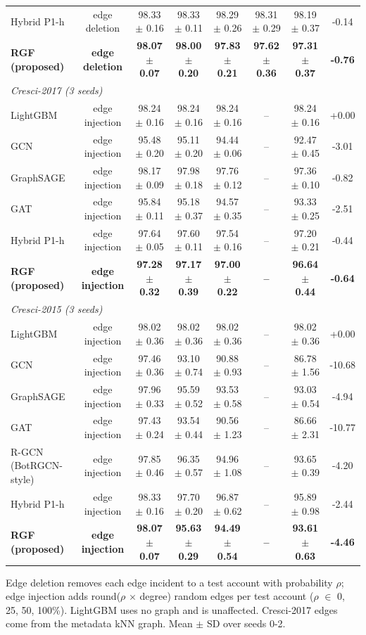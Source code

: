 \begin{table}[!t]
\begin{tabular}{lccccccc}
Hybrid P1-h & edge deletion & 98.33 $\pm$ 0.16 & 98.33 $\pm$ 0.11 & 98.29 $\pm$ 0.26 & 98.31 $\pm$ 0.29 & 98.19 $\pm$ 0.37 & -0.14 \\
\textbf{RGF (proposed)} & \textbf{edge deletion} & \textbf{98.07 $\pm$ 0.07} & \textbf{98.00 $\pm$ 0.20} & \textbf{97.83 $\pm$ 0.21} & \textbf{97.62 $\pm$ 0.36} & \textbf{97.31 $\pm$ 0.37} & \textbf{-0.76} \\
\multicolumn{8}{l}{\textit{Cresci-2017 (3 seeds)}} \\
LightGBM & edge injection & 98.24 $\pm$ 0.16 & 98.24 $\pm$ 0.16 & 98.24 $\pm$ 0.16 & -- & 98.24 $\pm$ 0.16 & +0.00 \\
GCN & edge injection & 95.48 $\pm$ 0.20 & 95.11 $\pm$ 0.20 & 94.44 $\pm$ 0.06 & -- & 92.47 $\pm$ 0.45 & -3.01 \\
GraphSAGE & edge injection & 98.17 $\pm$ 0.09 & 97.98 $\pm$ 0.18 & 97.76 $\pm$ 0.12 & -- & 97.36 $\pm$ 0.10 & -0.82 \\
GAT & edge injection & 95.84 $\pm$ 0.11 & 95.18 $\pm$ 0.37 & 94.57 $\pm$ 0.35 & -- & 93.33 $\pm$ 0.25 & -2.51 \\
Hybrid P1-h & edge injection & 97.64 $\pm$ 0.05 & 97.60 $\pm$ 0.11 & 97.54 $\pm$ 0.16 & -- & 97.20 $\pm$ 0.21 & -0.44 \\
\textbf{RGF (proposed)} & \textbf{edge injection} & \textbf{97.28 $\pm$ 0.32} & \textbf{97.17 $\pm$ 0.39} & \textbf{97.00 $\pm$ 0.22} & \textbf{--} & \textbf{96.64 $\pm$ 0.44} & \textbf{-0.64} \\
\multicolumn{8}{l}{\textit{Cresci-2015 (3 seeds)}} \\
LightGBM & edge injection & 98.02 $\pm$ 0.36 & 98.02 $\pm$ 0.36 & 98.02 $\pm$ 0.36 & -- & 98.02 $\pm$ 0.36 & +0.00 \\
GCN & edge injection & 97.46 $\pm$ 0.36 & 93.10 $\pm$ 0.74 & 90.88 $\pm$ 0.93 & -- & 86.78 $\pm$ 1.56 & -10.68 \\
GraphSAGE & edge injection & 97.96 $\pm$ 0.33 & 95.59 $\pm$ 0.52 & 93.53 $\pm$ 0.58 & -- & 93.03 $\pm$ 0.54 & -4.94 \\
GAT & edge injection & 97.43 $\pm$ 0.24 & 93.54 $\pm$ 0.44 & 90.56 $\pm$ 1.23 & -- & 86.66 $\pm$ 2.31 & -10.77 \\
R-GCN (BotRGCN-style) & edge injection & 97.85 $\pm$ 0.46 & 96.35 $\pm$ 0.57 & 94.96 $\pm$ 1.08 & -- & 93.65 $\pm$ 0.39 & -4.20 \\
Hybrid P1-h & edge injection & 98.33 $\pm$ 0.16 & 97.70 $\pm$ 0.20 & 96.87 $\pm$ 0.62 & -- & 95.89 $\pm$ 0.98 & -2.44 \\
\textbf{RGF (proposed)} & \textbf{edge injection} & \textbf{98.07 $\pm$ 0.07} & \textbf{95.63 $\pm$ 0.29} & \textbf{94.49 $\pm$ 0.54} & \textbf{--} & \textbf{93.61 $\pm$ 0.63} & \textbf{-4.46} \\
\hline
\end{tabular}
\par\smallskip\parbox{\linewidth}{\scriptsize Edge deletion removes each edge incident to a test account with probability $\rho$; edge injection adds round($\rho$ $\times$ degree) random edges per test account ($\rho$ $\in$ {0, 25, 50, 100}\%). LightGBM uses no graph and is unaffected. Cresci-2017 edges come from the metadata kNN graph. Mean $\pm$ SD over seeds 0-2.}
\end{table}